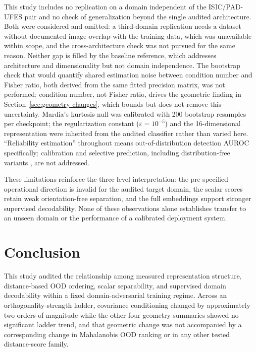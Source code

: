 This study includes no replication on a domain independent of the ISIC/PAD-UFES pair and no check of generalization beyond the single audited architecture. Both were considered and omitted: a third-domain replication needs a dataset without documented image overlap with the training data, which was unavailable within scope, and the cross-architecture check was not pursued for the same reason. Neither gap is filled by the baseline reference, which addresses architecture and dimensionality but not domain independence. The bootstrap check that would quantify shared estimation noise between condition number and Fisher ratio, both derived from the same fitted precision matrix, was not performed; condition number, not Fisher ratio, drives the geometric finding in Section~\ref{sec:geometry-changes}, which bounds but does not remove this uncertainty. Mardia's kurtosis null was calibrated with 200 bootstrap resamples per checkpoint; the regularization constant ($\varepsilon = 10^{-5}$) and the 16-dimensional representation were inherited from the audited classifier rather than varied here. ``Reliability estimation'' throughout means out-of-distribution detection AUROC specifically; calibration \citep{guo2017calibration} and selective prediction, including distribution-free variants \citep{elyaniv2010foundations, geifman2017selective, angelopoulos2023conformal}, are not addressed.

These limitations reinforce the three-level interpretation: the pre-specified operational direction is invalid for the audited target domain, the scalar scores retain weak orientation-free separation, and the full embeddings support stronger supervised decodability. None of these observations alone establishes transfer to an unseen domain or the performance of a calibrated deployment system.

\section{Conclusion}
\label{sec:conclusion}

This study audited the relationship among measured representation structure, distance-based OOD ordering, scalar separability, and supervised domain decodability within a fixed domain-adversarial training regime. Across an orthogonality-strength ladder, covariance conditioning changed by approximately two orders of magnitude while the other four geometry summaries showed no significant ladder trend, and that geometric change was not accompanied by a corresponding change in Mahalanobis OOD ranking or in any other tested distance-score family.

